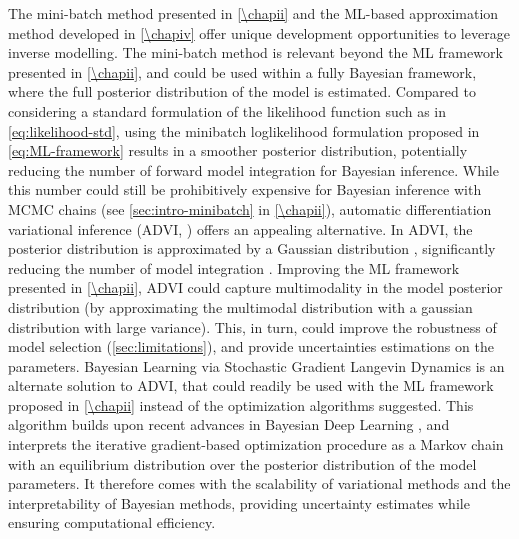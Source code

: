 The mini-batch method presented in \cref{\chapii} and the ML-based approximation method developed in \cref{\chapiv} offer unique development opportunities to leverage inverse modelling.
The mini-batch method is relevant beyond the ML framework presented in \cref{\chapii}, and could be used within a fully Bayesian framework, where the full posterior distribution of the model is estimated. Compared to considering a standard formulation of the likelihood function such as in \cref{eq:likelihood-std}, using the minibatch loglikelihood formulation proposed in \cref{eq:ML-framework} results in a smoother posterior distribution, potentially reducing the number of forward model integration for Bayesian inference.
% 
While this number could still be prohibitively expensive for Bayesian inference with MCMC chains (see \cref{sec:intro-minibatch} in \cref{\chapii}), automatic differentiation variational inference (ADVI, \cite{Morningstar2020,Gosh2021}) offers an appealing alternative. In ADVI, the posterior distribution is approximated by a Gaussian distribution \citep{Morningstar2020}, significantly reducing the number of model integration \citep{Morningstar2020}. Improving the ML framework presented in \cref{\chapii}, ADVI could capture multimodality in the model posterior distribution (by approximating the multimodal distribution with a gaussian distribution with large variance). This, in turn, could improve the robustness of model selection (\cref{sec:limitations}), and provide uncertainties estimations on the parameters.
% 
Bayesian Learning via Stochastic Gradient Langevin Dynamics \citep{Welling2011BayesianLV} is an alternate solution to ADVI, that could readily be used with the ML framework proposed in \cref{\chapii} instead of the optimization algorithms suggested. This algorithm builds upon recent advances in Bayesian Deep Learning \citep{Wilson2020}, and interprets the iterative gradient-based optimization procedure as a Markov chain with an equilibrium distribution over the posterior distribution of the model parameters. It therefore comes with the scalability of variational methods and the interpretability of Bayesian methods, providing uncertainty estimates while ensuring computational efficiency.


